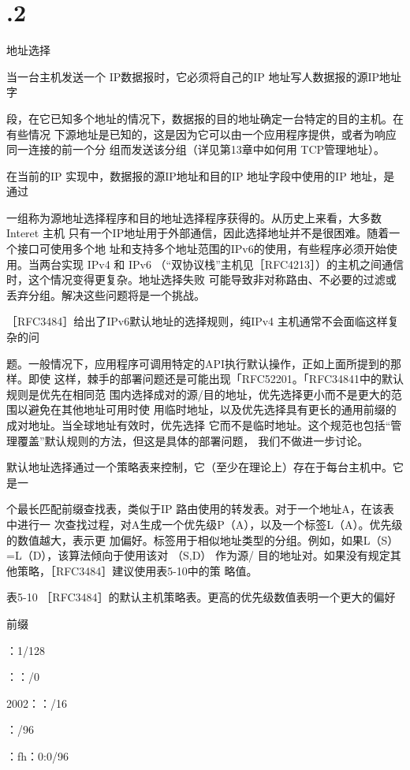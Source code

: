 \section{.2}
地址选择

当一台主机发送一个 IP数据报时，它必须将自己的IP 地址写人数据报的源IP地址字

段，在它已知多个地址的情况下，数据报的目的地址确定一台特定的目的主机。在有些情况
下源地址是已知的，这是因为它可以由一个应用程序提供，或者为响应同一连接的前一个分
组而发送该分组（详见第13章中如何用 TCP管理地址）。

在当前的IP 实现中，数据报的源IP地址和目的IP 地址字段中使用的IP 地址，是通过

一组称为源地址选择程序和目的地址选择程序获得的。从历史上来看，大多数 Interet 主机
只有一个IP地址用于外部通信，因此选择地址并不是很困难。随着一个接口可使用多个地
址和支持多个地址范围的IPv6的使用，有些程序必须开始使用。当两台实现 IPv4 和 IPv6
（“双协议栈”主机见［RFC4213］）的主机之间通信时，这个情况变得更复杂。地址选择失败
可能导致非对称路由、不必要的过滤或丢弃分组。解决这些问题将是一个挑战。

［RFC3484］给出了IPv6默认地址的选择规则，纯IPv4 主机通常不会面临这样复杂的问

题。一般情况下，应用程序可调用特定的API执行默认操作，正如上面所提到的那样。即使
这样，棘手的部署问题还是可能出现「RFC52201。「RFC34841中的默认规则是优先在相同范
围内选择成对的源/目的地址，优先选择更小而不是更大的范围以避免在其他地址可用时使
用临时地址，以及优先选择具有更长的通用前缀的成对地址。当全球地址有效时，优先选择
它而不是临时地址。这个规范也包括“管理覆盖”默认规则的方法，但这是具体的部署问题，
我们不做进一步讨论。

默认地址选择通过一个策略表来控制，它（至少在理论上）存在于每台主机中。它是一

个最长匹配前缀查找表，类似于IP 路由使用的转发表。对于一个地址A，在该表中进行一
次查找过程，对A生成一个优先级P（A），以及一个标签L（A）。优先级的数值越大，表示更
加偏好。标签用于相似地址类型的分组。例如，如果L（S） =L（D），该算法倾向于使用该对
（S,D） 作为源/ 目的地址对。如果没有规定其他策略，［RFC3484］建议使用表5-10中的策
略值。

表5-10 ［RFC3484］的默认主机策略表。更高的优先级数值表明一个更大的偏好

前缀

：1/128

：：/0

2002：：/16

：/96

：fh：0:0/96


